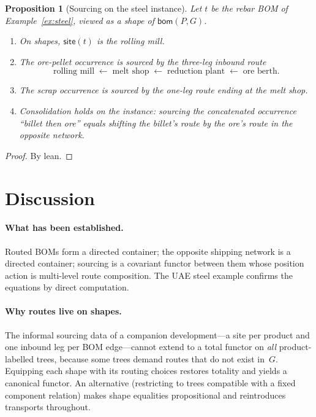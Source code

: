 \documentclass[11pt,a4paper]{article}
\theoremstyle{plain}
\newtheorem{proposition}[theorem]{Proposition}
\theoremstyle{definition}
\newcommand{\bom}{\mathsf{bom}}
\newcommand{\site}{\mathsf{site}}
\begin{document}
\begin{proposition}[Sourcing on the steel instance]\label{prop:steel}
Let $t$ be the rebar BOM of Example~\ref{ex:steel}, viewed as a shape of
$\bom(P,G)$.
\begin{enumerate}
  \item On shapes, $\site(t)$ is the rolling mill.
  \item The ore-pellet occurrence is sourced by the three-leg inbound
        route
        \[
          \text{rolling mill}
          \;\leftarrow\;
          \text{melt shop}
          \;\leftarrow\;
          \text{reduction plant}
          \;\leftarrow\;
          \text{ore berth}.
        \]
  \item The scrap occurrence is sourced by the one-leg route ending at
        the melt shop.
  \item Consolidation holds on the instance: sourcing the concatenated
        occurrence ``billet then ore'' equals shifting the billet's route
        by the ore's route in the opposite network.
\end{enumerate}
\end{proposition}

\begin{proof}
By lean.
\end{proof}

\section{Discussion}

\paragraph{What has been established.}
Routed BOMs form a directed container; the opposite shipping network is a
directed container; sourcing is a covariant functor between them whose
position action is multi-level route composition. The UAE steel example
confirms the equations by direct computation.

\paragraph{Why routes live on shapes.}
The informal sourcing data of a companion development---a site per
product and one inbound leg per BOM edge---cannot extend to a total
functor on \emph{all} product-labelled trees, because some trees demand
routes that do not exist in~$G$. Equipping each shape with its routing
choices restores totality and yields a canonical functor. An alternative
(restricting to trees compatible with a fixed component relation) makes
shape equalities propositional and reintroduces transports throughout.
\end{document}

